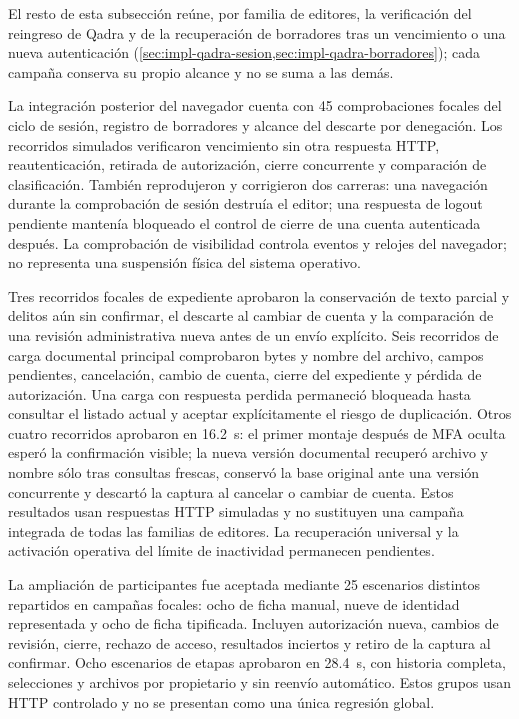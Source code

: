 El resto de esta subsección reúne, por familia de editores, la verificación del
reingreso de Qadra y de la recuperación de borradores tras un vencimiento o una
nueva autenticación (\cref{sec:impl-qadra-sesion,sec:impl-qadra-borradores});
cada campaña conserva su propio alcance y no se suma a las demás.

La integración posterior del navegador cuenta con 45 comprobaciones focales
del ciclo de sesión, registro de borradores y alcance del descarte por
denegación. Los recorridos simulados verificaron vencimiento sin otra respuesta
HTTP, reautenticación, retirada de autorización, cierre concurrente y comparación
de clasificación. También reprodujeron y corrigieron dos carreras: una navegación
durante la comprobación de sesión destruía el editor; una respuesta de logout
pendiente mantenía bloqueado el control de cierre de una cuenta autenticada
después. La comprobación de visibilidad controla eventos y relojes del navegador;
no representa una suspensión física del sistema operativo.

Tres recorridos focales de expediente aprobaron la conservación de texto parcial
y delitos aún sin confirmar, el descarte al cambiar de cuenta y la comparación
de una revisión administrativa nueva antes de un envío explícito. Seis
recorridos de carga documental principal comprobaron bytes y nombre del archivo,
campos pendientes, cancelación, cambio de cuenta, cierre del expediente y pérdida
de autorización. Una carga con respuesta perdida permaneció bloqueada hasta
consultar el listado actual y aceptar explícitamente el riesgo de duplicación.
Otros cuatro recorridos aprobaron en 16.2~s: el primer montaje después de MFA
oculta esperó la confirmación visible; la nueva versión documental recuperó
archivo y nombre sólo tras consultas frescas, conservó la base original ante
una versión concurrente y descartó la captura al cancelar o cambiar de cuenta.
Estos resultados usan respuestas HTTP simuladas y no sustituyen una campaña
integrada de todas las familias de editores. La recuperación universal y la
activación operativa del límite de inactividad permanecen pendientes.


La ampliación de participantes fue aceptada mediante 25 escenarios distintos
repartidos en campañas focales: ocho de ficha manual, nueve de identidad
representada y ocho de ficha tipificada. Incluyen autorización nueva, cambios de
revisión, cierre, rechazo de acceso, resultados inciertos y retiro de la captura
al confirmar. Ocho escenarios de etapas aprobaron en 28.4~s, con historia completa,
selecciones y archivos por propietario y sin reenvío automático. Estos grupos
usan HTTP controlado y no se presentan como una única regresión global.

